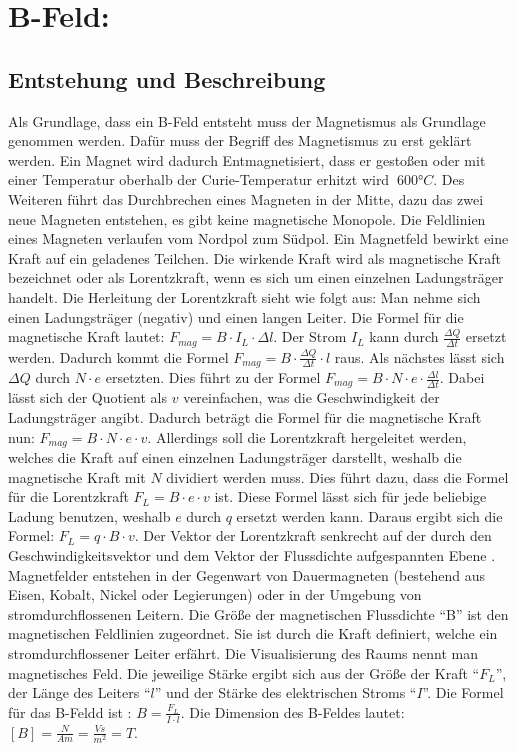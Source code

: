 \section{B-Feld:}
\subsection{Entstehung und Beschreibung}
Als Grundlage, dass ein B-Feld entsteht muss der Magnetismus als Grundlage genommen werden.
Dafür muss der Begriff des Magnetismus zu erst geklärt werden.
Ein Magnet wird dadurch Entmagnetisiert, dass er gestoßen oder mit einer Temperatur oberhalb der Curie-Temperatur erhitzt wird $~600°C$.
Des Weiteren führt das Durchbrechen eines Magneten in der Mitte, dazu das zwei neue Magneten entstehen, es gibt keine magnetische Monopole.
Die Feldlinien eines Magneten verlaufen vom Nordpol zum Südpol.
Ein Magnetfeld bewirkt eine Kraft auf ein geladenes Teilchen.
Die wirkende Kraft wird als magnetische Kraft bezeichnet oder als Lorentzkraft, wenn es sich um einen einzelnen Ladungsträger handelt.
Die Herleitung der Lorentzkraft sieht wie folgt aus:
Man nehme sich einen Ladungsträger (negativ) und einen langen Leiter.
Die Formel für die magnetische Kraft lautet: $F_{mag} =  B \cdot I_L \cdot \Delta l$.
Der Strom $I_L$ kann durch $\frac{\Delta Q}{\Delta t}$ ersetzt werden.
Dadurch kommt die Formel $F_{mag} = B \cdot \frac{\Delta Q}{\Delta t} \cdot l$ raus. 
Als nächstes lässt sich $\Delta Q$ durch $N \cdot e$ ersetzten.
Dies führt zu der Formel $F_{mag} = B \cdot N \cdot e \cdot \frac{\Delta l}{\Delta t}$.
Dabei lässt sich der Quotient als $v$ vereinfachen, was die Geschwindigkeit der Ladungsträger angibt.
Dadurch beträgt die Formel für die magnetische Kraft nun: $F_{mag} = B \cdot N \cdot e \cdot v$.
Allerdings soll die Lorentzkraft hergeleitet werden, welches die Kraft auf einen einzelnen Ladungsträger darstellt, weshalb die magnetische Kraft mit $N$ dividiert werden muss.
Dies führt dazu, dass die Formel für die Lorentzkraft $F_L = B \cdot e \cdot v$ ist.
Diese Formel lässt sich für jede beliebige Ladung benutzen, weshalb $e$ durch $q$ ersetzt werden kann.
Daraus ergibt sich die Formel: $F_L = q \cdot B \cdot v$.
Der Vektor der Lorentzkraft senkrecht auf der durch den Geschwindigkeitsvektor und dem Vektor der Flussdichte aufgespannten Ebene \cite{Lorentzkraft}.
Magnetfelder entstehen in der Gegenwart von Dauermagneten (bestehend aus Eisen, Kobalt, Nickel oder Legierungen) oder in der Umgebung von stromdurchflossenen Leitern. 
Die Größe der magnetischen Flussdichte "`B"' ist den magnetischen Feldlinien zugeordnet.
Sie ist durch die Kraft definiert, welche ein stromdurchflossener Leiter erfährt.
Die Visualisierung des Raums nennt man magnetisches Feld.
Die jeweilige Stärke ergibt sich aus der Größe der Kraft "`$F_L$"', der Länge des Leiters "`$l$"' und der Stärke des elektrischen Stroms "`$I$"'.
Die Formel für das B-Feldd ist : $B = \frac{F_L}{I \cdot l}$.
Die Dimension des B-Feldes lautet: $[B] = \frac{N}{Am} = \frac{Vs}{m^2} = T$.

